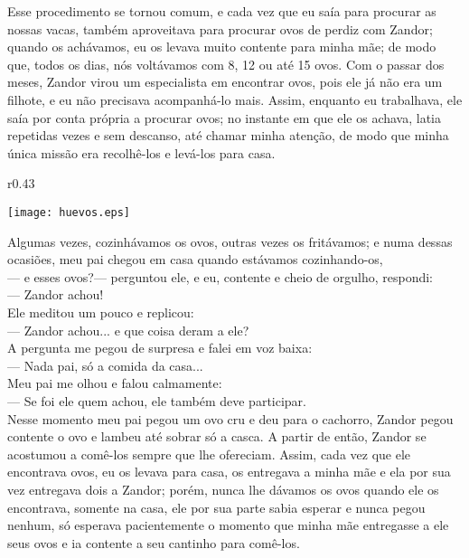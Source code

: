 Esse procedimento se tornou comum, e cada vez que eu saía para procurar as nossas vacas, também aproveitava para procurar ovos de perdiz com Zandor; quando os achávamos, eu os levava muito contente para minha mãe; de modo que, todos os dias, nós voltávamos com 8, 12 ou até 15 ovos. 
Com o passar dos meses, Zandor virou um especialista em encontrar ovos, pois ele já não era um filhote, e eu não precisava acompanhá-lo mais. Assim, enquanto eu trabalhava, ele saía por conta própria a procurar ovos; no instante em que ele os achava, latia repetidas vezes e sem descanso, até chamar minha atenção, de modo que minha única missão era recolhê-los e levá-los para casa.
\ifdefined\EnableIncludeImages
\begin{wrapfigure}{r}{0.43\textwidth}
  \begin{center}
  \vspace{-20pt}
    \texttt{[image: huevos.eps]}
  \end{center}
  \vspace{-20pt}
\end{wrapfigure}
\fi
Algumas vezes, cozinhávamos os ovos, outras vezes os fritávamos; e numa dessas ocasiões, meu pai chegou em casa quando estávamos cozinhando-os,\\\indent
--- e esses ovos?--- perguntou ele, 
e eu, contente e cheio de orgulho, respondi:\\\indent 
--- Zandor achou!\\\indent
Ele meditou um pouco e replicou:\\\indent 
--- Zandor achou... e que coisa deram a ele?\\\indent
A pergunta me pegou de surpresa e falei em voz baixa:\\\indent 
--- Nada pai, só a comida da casa... \\\indent
Meu pai me olhou e falou calmamente: \\\indent
--- Se foi ele quem achou, ele também deve participar.\\\indent
Nesse momento meu pai pegou um ovo cru e deu para o cachorro, Zandor pegou contente o ovo e lambeu até sobrar só a casca. A partir de então, Zandor se acostumou a comê-los sempre que lhe ofereciam. 
Assim, cada vez que ele encontrava ovos, eu os levava para casa, os entregava a minha mãe e ela por sua vez entregava dois a Zandor; porém, nunca lhe dávamos os ovos quando ele os encontrava, somente na casa, ele por sua parte sabia esperar e nunca pegou nenhum, só esperava pacientemente o momento que minha mãe entregasse a ele seus ovos e ia contente a seu cantinho para comê-los.



